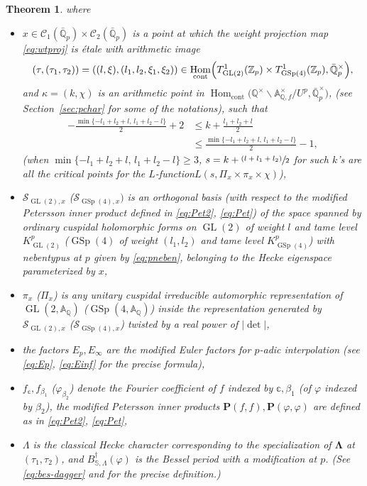 \documentclass[JEP,XML,SOM,Unicode,published]{cedram}
\newcommand{\psfrac}[2]{\sfrac{(#1)}{#2}}
\newcommand{\Lfunction}{$L$\nobreakdash-func\-tion\xspace}
\theoremstyle{plain}
\newtheorem{thmintro}{Theorem}[section]
\theoremstyle{remark}
\newcommand{\bA}{\mathbb{A}}
\newcommand{\bQ}{\mathbb{Q}}
\newcommand{\bS}{\mathbb{S}}
\newcommand{\bZ}{\mathbb{Z}}
\newcommand{\bbc}{\mathbb{c}}
\newcommand{\sC}{\mathscr{C}}
\newcommand{\sS}{\mathscr{S}}
\newcommand{\bfP}{\mathbf{P}}
\DeclareMathOperator{\GL}{GL}
\DeclareMathOperator{\GSp}{GSp}
\newcommand{\cont}{\mathrm{cont}}
\DeclareMathOperator{\Hom}{Hom}
\let\bes B
\newcommand{\bLam}{\boldsymbol\Lambda}
\begin{document}
\begin{thmintro}
\begin{minipage}{\textwidth}
\end{minipage}
\noindent
where
\begin{itemize}
\item
$x\in \sC_1(\bar{\bQ}_p)\times\sC_2(\bar{\bQ}_p)$ is a point at which the weight projection map \eqref{eq:wtproj} is \'{e}tale with arithmetic image
\[
(\tau,(\tau_1,\tau_2))=((l,\xi),(l_1,l_2,\xi_1,\xi_2))
\in \Hom_\cont\Bigl(T^1_{\GL(2)}(\bZ_p)\times T^1_{\GSp(4)}(\bZ_p),\bar{\bQ}^\times_p\Bigr),
\]
and $\kappa=(k,\chi)$ is an arithmetic point in $\Hom_\cont\bigl(\bQ^\times\backslash\bA^\times_{\bQ,f}/U^p,\bar{\bQ}^\times_p\bigr)$, (see Section~\ref{sec:pchar} for some of the notations), such that
\begin{equation}
\begin{aligned}\label{eq:kl}
-\frac{\min\{-l_1+l_2+l,\,l_1+l_2-l\}}{2}+2 &\leq k+\frac{l_1+l_2+l}{2}\\
&\leq \frac{\min\{-l_1+l_2+l,\,l_1+l_2-l\}}{2}-1,
\end{aligned}
\end{equation}
(when $\min\{-l_1+l_2+l,\,l_1+l_2-l\}\geq 3$, $s=k+\psfrac{l+l_1+l_2}{2}$ for such $k$'s are all the critical points for the \Lfunction $L(s,\Pi_x\times\pi_x\times\chi)$),
\item
$\sS_{\GL(2),x}$ (\resp $\sS_{\GSp(4),x})$ is an orthogonal basis (with respect to the modified \hbox{Petersson} inner product defined in \eqref{eq:Pet2}, \eqref{eq:Pet}) of the space spanned by ordinary cuspidal holomorphic forms on $\GL(2)$ of weight $l$ and tame level $K^p_{\GL(2)}$ (\resp $\GSp(4)$ of weight $(l_1,l_2)$ and tame level $K^p_{\GSp(4)}$) with nebentypus at $p$ given by \eqref{eq:pneben}, belonging to the Hecke eigenspace parameterized by $x$,
\item
$\pi_x$ (\resp $\Pi_x$) is any unitary cuspidal irreducible automorphic representation of $\GL(2,\bA_\bQ)$ (\resp $\GSp(4,\bA_\bQ)$) inside the representation generated by $\sS_{\GL(2),x}$ (\resp $\sS_{\GSp(4),x}$) twisted by a real power of $|\det|$,
\item
the factors $E_p,E_\infty$ are the modified Euler factors for $p$-adic interpolation (see \eqref{eq:Ep}, \eqref{eq:Einf} for the precise formula),
\item
$f_\bbc,f_{\beta_1}$ (\resp $\varphi_{\beta_2}$) denote the Fourier coefficient of $f$ indexed by $\bbc,\beta_1$ (\resp of $\varphi$ indexed by $\beta_2$), the modified Petersson inner products $\bfP(f,f),\bfP(\varphi,\varphi)$ are defined as in \eqref{eq:Pet2}, \eqref{eq:Pet},
\item
$\Lambda$ is the classical Hecke character corresponding to the specialization of $\bLam$ at $(\tau_1,\tau_2)$, and $\bes^\dagger_{\bS,\Lambda}(\varphi)$ is the Bessel period with a modification at $p$. (See \eqref{eq:bes-dagger} and \cite[\S2.2.1]{pFL} for the precise definition.)
\end{itemize}
\end{thmintro}
\end{document}
